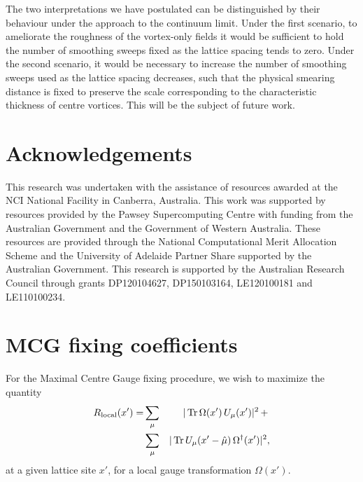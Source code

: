 \documentclass[
 reprint,
 amsmath,amssymb,
 aps,
prd,
]{revtex4-1}
\begin{document}
The two interpretations we have postulated can be distinguished by their
behaviour under the approach to the continuum limit. Under the first
scenario, to ameliorate the roughness of the vortex-only fields it would
be sufficient to hold the number of smoothing sweeps fixed as the
lattice spacing tends to zero. Under the second scenario, it would be
necessary to increase the number of smoothing sweeps used as the lattice
spacing decreases, such that the physical smearing distance is fixed to
preserve the scale corresponding to the characteristic thickness of
centre vortices. This will be the subject of future work.

\section*{Acknowledgements}
This research was undertaken with the assistance of resources awarded at the NCI National Facility in Canberra, Australia. This work was supported by resources provided by the Pawsey Supercomputing Centre with funding from the Australian Government and the Government of Western Australia. These resources are provided through the National Computational Merit Allocation Scheme and the University of Adelaide Partner Share supported by the Australian Government.
%
This research is supported by the Australian Research Council through
grants DP120104627, DP150103164, LE120100181 and LE110100234.
%
%
%
\vspace{0.5cm}
\appendix*
%
\section{MCG fixing coefficients}
\label{Sec:appendix}

For the Maximal Centre Gauge fixing procedure, we wish to maximize the quantity
\begin{eqnarray}
R_{\textrm{local}}(x') = &\sum_{\mu}&|\, \mathrm{Tr} \, \Omega(x')\,U_{\mu}(x')|^{2} \,+\,  \\ \nonumber
&\sum_{\mu}&|\, \mathrm{Tr} \, U_{\mu}(x' - \hat{\mu})\,\Omega^{\dagger}(x')|^{2},
\end{eqnarray}
at a given lattice site $x'$, for a local gauge transformation $\Omega(x')$.
\end{document}
